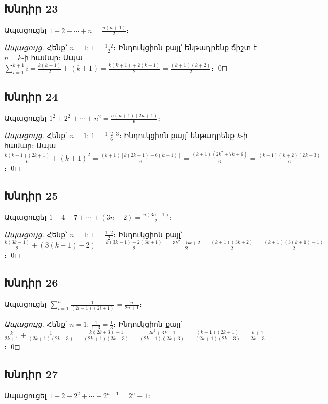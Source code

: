 \subsection*{Խնդիր 23}
Ապացուցել $1 + 2 + \cdots + n = \frac{n(n+1)}{2}$։

\textit{Ապացույց.} Հենք՝ $n=1$: $1 = \frac{1 \cdot 2}{2}$։ Ինդուկցիոն քայլ՝ ենթադրենք ճիշտ է $n=k$-ի համար։ Ապա
$\sum_{i=1}^{k+1} i = \frac{k(k+1)}{2} + (k+1) = \frac{k(k+1)+2(k+1)}{2} = \frac{(k+1)(k+2)}{2}$։ \qed

\subsection*{Խնդիր 24}
Ապացուցել $1^2 + 2^2 + \cdots + n^2 = \frac{n(n+1)(2n+1)}{6}$։

\textit{Ապացույց.} Հենք՝ $n=1$: $1 = \frac{1 \cdot 2 \cdot 3}{6}$։ Ինդուկցիոն քայլ՝ ենթադրենք $k$-ի համար։ Ապա
$\frac{k(k+1)(2k+1)}{6} + (k+1)^2 = \frac{(k+1)[k(2k+1)+6(k+1)]}{6} = \frac{(k+1)(2k^2+7k+6)}{6} = \frac{(k+1)(k+2)(2k+3)}{6}$։ \qed

\subsection*{Խնդիր 25}
Ապացուցել $1 + 4 + 7 + \cdots + (3n-2) = \frac{n(3n-1)}{2}$։

\textit{Ապացույց.} Հենք՝ $n=1$: $1 = \frac{1 \cdot 2}{2}$։ Ինդուկցիոն քայլ՝
$\frac{k(3k-1)}{2} + (3(k+1)-2) = \frac{k(3k-1) + 2(3k+1)}{2} = \frac{3k^2+5k+2}{2} = \frac{(k+1)(3k+2)}{2} = \frac{(k+1)(3(k+1)-1)}{2}$։ \qed

\subsection*{Խնդիր 26}
Ապացուցել $\sum_{i=1}^{n} \frac{1}{(2i-1)(2i+1)} = \frac{n}{2n+1}$։

\textit{Ապացույց.} Հենք՝ $n=1$: $\frac{1}{1 \cdot 3} = \frac{1}{3}$։ Ինդուկցիոն քայլ՝
$\frac{k}{2k+1} + \frac{1}{(2k+1)(2k+3)} = \frac{k(2k+3)+1}{(2k+1)(2k+3)} = \frac{2k^2+3k+1}{(2k+1)(2k+3)} = \frac{(k+1)(2k+1)}{(2k+1)(2k+3)} = \frac{k+1}{2k+3}$։ \qed

\subsection*{Խնդիր 27}
Ապացուցել $1 + 2 + 2^2 + \cdots + 2^{n-1} = 2^n - 1$։

